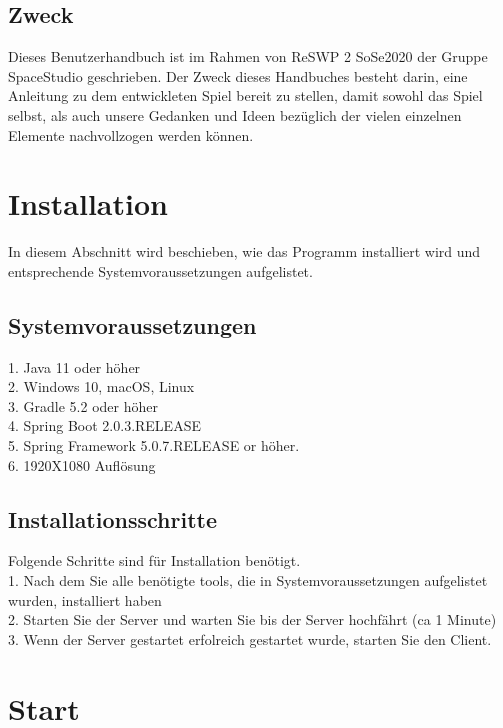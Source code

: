 \documentclass[fontsize=12pt,paper=a4,twoside]{scrartcl}
\begin{document}
\subsection{Zweck}

Dieses Benutzerhandbuch ist im Rahmen von ReSWP 2 SoSe2020  der Gruppe SpaceStudio geschrieben.
Der Zweck dieses Handbuches besteht darin, eine Anleitung zu dem entwickleten Spiel bereit zu stellen, damit sowohl das Spiel selbst, als auch unsere Gedanken und Ideen bezüglich der vielen einzelnen Elemente nachvollzogen werden können.


\section{Installation}
In diesem Abschnitt wird beschieben, wie das Programm installiert wird und entsprechende Systemvoraussetzungen aufgelistet.

\subsection{Systemvoraussetzungen}
1. Java 11 oder höher \\
2. Windows 10, macOS, Linux \\
3. Gradle 5.2 oder höher \\
4. Spring Boot 2.0.3.RELEASE \\
5.  Spring Framework 5.0.7.RELEASE or höher. \\
6. 1920X1080 Auflösung
 

\subsection{Installationsschritte}
Folgende  Schritte sind für Installation benötigt. \\
1. Nach dem Sie alle benötigte tools, die in Systemvoraussetzungen aufgelistet wurden, installiert haben \\
2. Starten Sie der Server und warten Sie bis der Server hochfährt (ca 1 Minute)\\
3. Wenn der Server gestartet erfolreich gestartet wurde, starten Sie den Client.

 



\section{Start}
\end{document}
